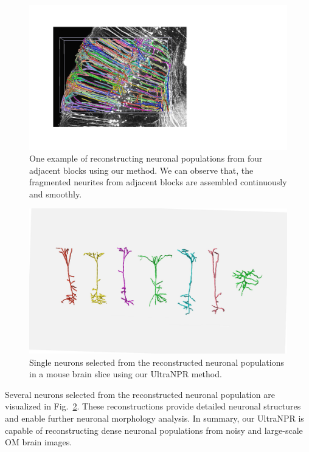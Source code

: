 
\begin{figure}[t]
	\centering
	\includegraphics[width=1\columnwidth]{./Illustrations/trace_four_blocks2.pdf}
	\caption{One example of reconstructing neuronal populations from four adjacent blocks using our method. We can observe that, the fragmented neurites from adjacent blocks are assembled continuously and smoothly. }
	\label{fig:reconstruct_blocks}
\end{figure}



\begin{figure}[t]
	\centering
	\includegraphics[width=0.8\columnwidth]{./Illustrations/single_neurons4.pdf}
	\caption{Single neurons selected from the reconstructed neuronal populations in a mouse brain slice using our UltraNPR method.}
	\label{fig:single_neurons}
\end{figure}


Several neurons selected from the reconstructed neuronal population are visualized in Fig.~\ref{fig:single_neurons}. These reconstructions provide detailed neuronal structures and enable further neuronal morphology analysis. 
In summary, our UltraNPR is capable of reconstructing dense neuronal populations from noisy and large-scale OM brain images.

